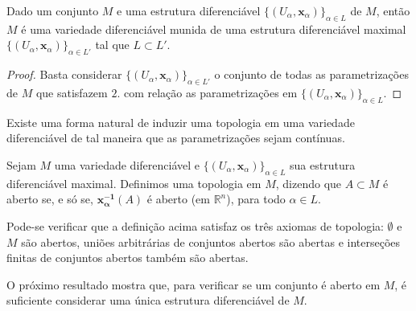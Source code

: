 	\begin{proposition}
		\label{prop:estrutura-diferencial-maximal}
		Dado um conjunto $M$ e uma estrutura diferenciável $\{ (U_{\alpha}, \mathbf{x}_{\alpha}) \}_{\alpha \in L}$ de $M$, então $M$ é uma variedade diferenciável munida de uma estrutura diferenciável maximal $\{ (U_{\alpha}, \mathbf{x}_{\alpha}) \}_{\alpha \in L'}$ tal que $L \subset L'$.
		\begin{proof}

			Basta considerar $\{ (U_{\alpha}, \mathbf{x}_{\alpha}) \}_{\alpha \in L'}$ o conjunto de todas as parametrizações de $M$ que satisfazem $2$. com relação as parametrizações em $\{ (U_{\alpha}, \mathbf{x}_{\alpha}) \}_{\alpha \in L}$.
		\end{proof}
	\end{proposition}
	Existe uma forma natural de induzir uma topologia em uma variedade diferenciável de tal maneira que as parametrizações sejam contínuas.
	\begin{definition}
		\label{def:topologia-induzida}
		Sejam $M$ uma variedade diferenciável e $\{ (U_{\alpha}, \mathbf{x}_{\alpha}) \}_{\alpha \in L}$ sua estrutura diferenciável maximal. Definimos uma topologia em $M$, dizendo que $A \subset M$ é aberto se, e só se, $\mathbf{x_{\alpha}^{-1}}(A)$ é aberto (em $\mathbb{R}^{n}$), para todo $\alpha \in L$.
	\end{definition}
	Pode-se verificar que a definição acima satisfaz os três axiomas de topologia: $\emptyset$ e $M$ são abertos, uniões arbitrárias de conjuntos abertos são abertas e interseções finitas de conjuntos abertos também são abertas.

	O próximo resultado mostra que, para verificar se um conjunto é aberto em $M$, é suficiente considerar uma única estrutura diferenciável de $M$.

